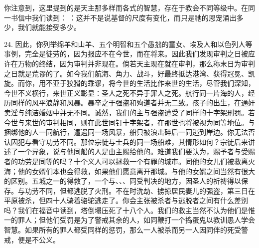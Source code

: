 你注意到，这里提到的是天主那多样而各式的智慧，存在于教会不同等级中。在同一书信中我们读到： ：这并不是说基督的尺度有变化，而只是祂的恩宠涌出多少，我们就能接受多少。\par

24. 因此，你列举绵羊和山羊、五个明智和五个愚拙的童女、埃及人和以色列人等事例，完全是徒劳的，因为报应不在今世，而在将来。因此我们发现审判之日被应许在万物的终结，因为审判并非现在。倘若天主现在就在审判，那么称末日为审判之日就是荒谬的了。如今我们航海、角力、战斗，好最终抵达港湾、获得冠冕、凯旋。而你，用不亚于狡猾的乖谬，将今世的生活比作来世的生活，尽管我们深知，今世不义横行，来世正义彰显：圣人之死不异于罪人之死。航行同一片海的人，经历同样的风平浪静和风暴。暴卒之于强盗和殉道者并无二致。孩子的出生，在通奸卖淫与纯洁婚姻中并无不同。诚然，我们的主与强盗遭受了同样的十字架刑罚。若今世与来世的审判相同，则在此世同钉十字架者，在那世也将被视为同等地位。与捆绑他的人一同航行，遭遇同一场风暴，船只被浪击碎后一同逃到岸边。你无法否认囚犯与看守功劳不同。那位宗徒与士兵的同一场船难，其情形如何？宗徒后来讲述了一个异象，说与他同船的人是由主赐给他的。难道我们要认为，赐予者与受赐者的功劳是同等的吗？十个义人可以拯救一个有罪的城市。同他的女儿们被救离火海；他的女婿们本也会得救，如果他们愿意离开那城。与他的女婿之间当然有很大的区别。五城之一的得救了，一个与、、、同受判决的地方，因圣人的祈祷得以保存。与功劳不同，但都逃脱了火刑。不在时洗劫、掳掠居民妻儿的强盗，第三日在平原被杀，但四十人骑着骆驼逃走了。你会主张被杀者与逃脱者之间有什么差别吗？我们在福音中读到，塔倒塌压死了十八个人。我们的救主当然不认为他们是惟一的罪人；但他们受罚是为了警戒其余的人，如同鞭打一个捣蛋鬼以教训愚人学会智慧。如果所有的罪人都受同样的惩罚，那么一人被杀而另一人因同伴的死受警戒，便是不公义。\par

